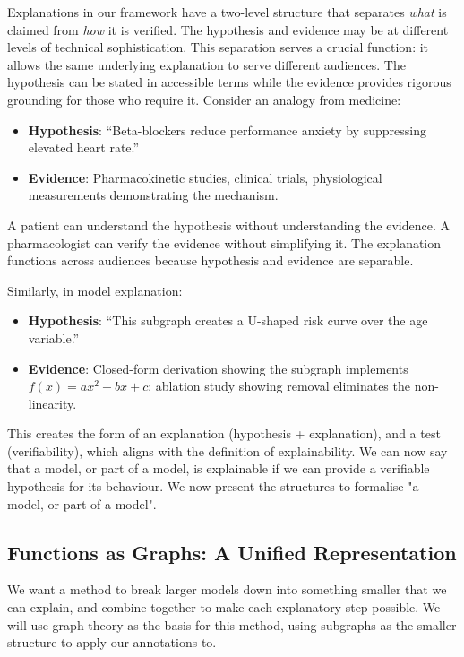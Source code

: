 \documentclass{article}
\begin{document}
Explanations in our framework have a two-level structure that separates \textit{what} is claimed from \textit{how} it is verified. The hypothesis and evidence may be at different levels of technical sophistication. This separation serves a crucial function: it allows the same underlying explanation to serve different audiences. The hypothesis can be stated in accessible terms while the evidence provides rigorous grounding for those who require it. Consider an analogy from medicine:

\begin{itemize}
    \item \textbf{Hypothesis}: ``Beta-blockers reduce performance anxiety by suppressing elevated heart rate.''
    \item \textbf{Evidence}: Pharmacokinetic studies, clinical trials, physiological measurements demonstrating the mechanism.
\end{itemize}

A patient can understand the hypothesis without understanding the evidence. A pharmacologist can verify the evidence without simplifying it. The explanation functions across audiences because hypothesis and evidence are separable.

Similarly, in model explanation:

\begin{itemize}
    \item \textbf{Hypothesis}: ``This subgraph creates a U-shaped risk curve over the age variable.''
    \item \textbf{Evidence}: Closed-form derivation showing the subgraph implements $f(x) = ax^2 + bx + c$; ablation study showing removal eliminates the non-linearity.
\end{itemize}

This creates the form of an explanation (hypothesis + explanation), and a test (verifiability), which aligns with the definition of explainability. We can now say that a model, or part of a model, is explainable if we can provide a verifiable hypothesis for its behaviour. We now present the structures to formalise "a model, or part of a model".

\subsection{Functions as Graphs: A Unified Representation}

We want a method to break larger models down into something smaller that we can explain, and combine together to make each explanatory step possible. We will use graph theory as the basis for this method, using subgraphs as the smaller structure to apply our annotations to.
\end{document}
